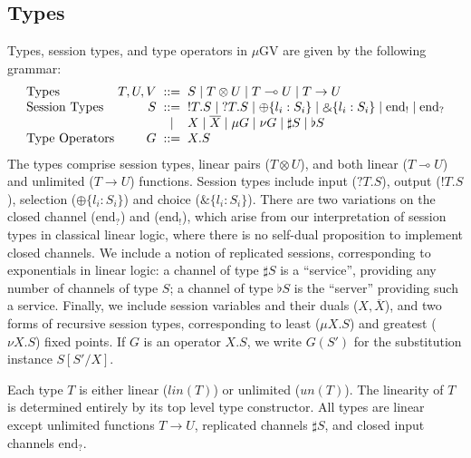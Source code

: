 \documentclass[orivec,envcountsame]{llncs}
\newcommand{\with}{\mathbin\binampersand}
\newcommand{\gvdual}[1]{\overline{#1}}
\newcommand{\gvout}[2]{{!#1.#2}}
\newcommand{\gvin}[2]{{?#1.#2}}
\newcommand{\lto}{\ensuremath{\multimap}}
\newcommand{\uto}{\ensuremath{\rightarrow}}
\newcommand{\outterm}{\mathrm{end}_!}
\newcommand{\interm}{\mathrm{end}_?}
\newcommand{\gvserver}[1]{\flat #1}
\newcommand{\gvservice}[1]{\sharp #1}
\newcommand{\un}{un}
\newcommand{\lin}{lin}
\newcommand{\mugv}{$\mu\mathrm{GV}$\xspace}
\begin{document}
\subsection{Types}
\label{sec:mugv-types}

Types, session types, and type operators in \mugv are given by the following grammar:
\[
\begin{array}{l@{\hspace{1mm}}r@{\hspace{2mm}}c@{\hspace{2mm}}l}
  \text{Types}         & T,U,V & ::= & S \mid T \otimes U \mid T \lto U \mid T \uto U \\
  \text{Session Types} & S     & ::= & \gvout{T}{S} \mid \gvin{T}{S}
                                \mid   \oplus \{ l_i : S_i \} \mid \with \{ l_i : S_i \}
                                \mid   \outterm \mid \interm \\
                            & & \mid & X \mid \gvdual{X}
                                \mid   \mu G \mid \nu G
                                \mid   \gvservice{S} \mid \gvserver{S} \\
  \text{Type Operators} & G    & ::= & X.S %
\end{array}
\]%
%
The types comprise session types, linear pairs ($T \otimes U$), and both linear ($T \lto U$) and
unlimited ($T \uto U$) functions.
%
Session types include input ($\gvin{T}{S}$), output ($\gvout{T}{S}$), selection ($\oplus\{ l_i:S_i
\}$) and choice ($\with\{l_i:S_i\}$). There are two variations on the closed channel ($\interm$) and
($\outterm$), which arise from our interpretation of session types in classical linear logic, where
there is no self-dual proposition to implement closed channels. We include a notion of replicated
sessions, corresponding to exponentials in linear logic: a channel of type $\gvservice{S}$ is a
``service'', providing any number of channels of type $S$; a channel of type $\gvserver{S}$ is the
``server'' providing such a service. Finally, we include session variables and their duals
($X,\gvdual{X}$), and two forms of recursive session types, corresponding to least ($\mu X.S$) and
greatest ($\nu X.S$) fixed points. If $G$ is an operator $X.S$, we write $G(S')$ for the
substitution instance $S[S'/X]$.

Each type $T$ is either linear ($\lin(T)$) or unlimited ($\un(T)$). The linearity of $T$ is
determined entirely by its top level type constructor.
%
All types are linear except unlimited functions $T \uto U$, replicated channels $\gvservice{S}$, and
closed input channels $\interm$.
\end{document}

